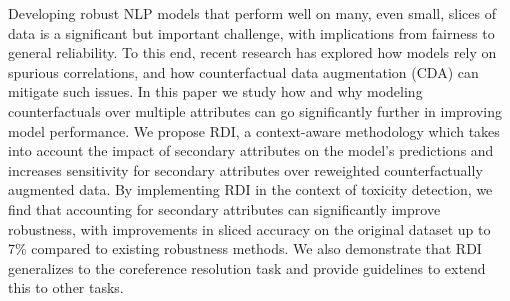 Developing robust NLP models that perform well on many, even small, slices of data is a significant but important challenge, with implications from fairness to general reliability.  To this end, recent research has explored how models rely on spurious correlations, and how counterfactual data augmentation (CDA) can mitigate such issues.  In this paper we study how and why modeling counterfactuals over multiple attributes can go significantly further in improving model performance. We propose RDI, a context-aware methodology which takes into account the impact of secondary attributes on the model's predictions and increases sensitivity for secondary attributes over reweighted counterfactually augmented data. By implementing RDI in the context of toxicity detection, we find that accounting for secondary attributes can significantly improve robustness, with improvements in sliced accuracy on the original dataset up to 7\% compared to existing robustness methods. We also demonstrate that RDI generalizes to the coreference resolution task and provide guidelines to extend this to other tasks.
